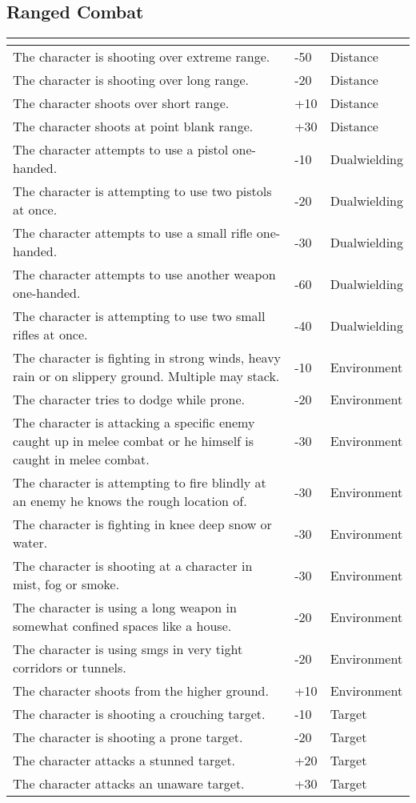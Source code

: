 \documentclass[12pt,a4paper,openany]{book}
\newcommand{\ul}[1]{\underline{\smash{#1}}}
\begin{document}
	\subsection{Ranged Combat}
	\begin{tabularx}{\textwidth}{|X|l|l|}
		\hline
		\ul{Situation} & \ul{Modifier} & \ul{Keyword} \\ \hline
		The character is shooting over extreme range. & -50 & Distance \\ \hline
		The character is shooting over long range. & -20 & Distance \\ \hline
		The character shoots over short range. & +10 & Distance \\ \hline
		The character shoots at point blank range. & +30 & Distance \\ \hline
		The character attempts to use a pistol one-handed. & -10 & Dualwielding \\ \hline
		The character is attempting to use two pistols at once. & -20 & Dualwielding \\ \hline
		The character attempts to use a small rifle one-handed. & -30 & Dualwielding \\ \hline
		The character attempts to use another weapon one-handed. & -60 & Dualwielding \\ \hline
		The character is attempting to use two small rifles at once. & -40 & Dualwielding \\ \hline
		The character is fighting in strong winds, heavy rain or on slippery ground. Multiple may stack. & -10 & Environment \\ \hline
		The character tries to dodge while prone. & -20 & Environment \\ \hline
		The character is attacking a specific enemy caught up in melee combat or he himself is caught in melee combat. & -30 & Environment \\ \hline
		The character is attempting to fire blindly at an enemy he knows the rough location of. & -30 & Environment \\ \hline
		The character is fighting in knee deep snow or water. & -30 & Environment \\ \hline
		The character is shooting at a character in mist, fog or smoke. & -30 & Environment \\ \hline
		The character is using a long weapon in somewhat confined spaces like a house. & -20 & Environment \\ \hline
		The character is using smgs in very tight corridors or tunnels. & -20 & Environment \\ \hline
		The character shoots from the higher ground. & +10 & Environment \\ \hline
		The character is shooting a crouching target. & -10 & Target \\ \hline
		The character is shooting a prone target. & -20 & Target \\ \hline
		The character attacks a stunned target. & +20 & Target \\ \hline
		The character attacks an unaware target. & +30 & Target \\ \hline
	\end{tabularx}
\end{document}

